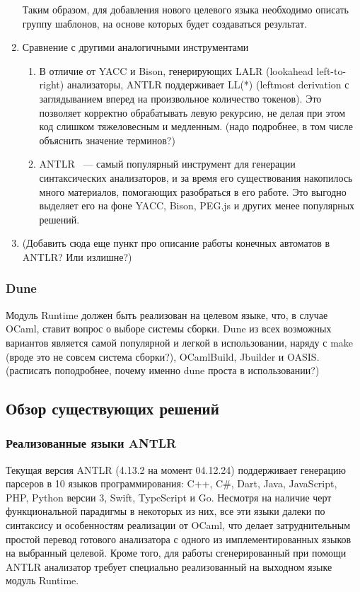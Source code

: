 \begin{enumerate}
    Таким образом, для добавления нового целевого языка необходимо описать группу шаблонов, на основе которых будет создаваться результат.
    \item Сравнение с другими аналогичными инструментами

    \begin{enumerate}
        \item В отличие от YACC и Bison, генерирующих LALR (lookahead left-to-right) анализаторы, ANTLR поддерживает LL(*) 
        (leftmost derivation с заглядыванием вперед на произвольное количество токенов). 
        Это позволяет корректно обрабатывать левую рекурсию, не делая при этом код слишком тяжеловесным и медленным. 
        (надо подробнее, в том числе объяснить значение терминов?)
        \item ANTLR ~--- самый популярный инструмент для генерации синтаксических анализаторов, и за время его существования накопилось 
        много материалов, помогающих разобраться в его работе. 
        Это выгодно выделяет его на фоне YACC, Bison, PEG.js и других менее популярных решений.
    \end{enumerate}

    \item (Добавить сюда еще пункт про описание работы конечных автоматов в ANTLR? Или излишне?)
\end{enumerate}

\subsubsection{Dune}

Модуль Runtime должен быть реализован на целевом языке, что, в случае OCaml, ставит вопрос о выборе системы сборки. 
Dune из всех возможных вариантов является самой популярной и легкой в использовании, наряду с make (вроде это не совсем система сборки?), 
OCamlBuild, Jbuilder и OASIS.
(расписать поподробнее, почему именно dune проста в использовании?)

\subsection{Обзор существующих решений}

\subsubsection{Реализованные языки ANTLR}

Текущая версия ANTLR (4.13.2 на момент 04.12.24) поддерживает генерацию парсеров в 10 языков программирования: 
C++, C\#, Dart, Java, JavaScript, PHP, Python версии 3, Swift, TypeScript и Go. 
Несмотря на наличие черт функциональной парадигмы в некоторых из них, все эти языки далеки по синтаксису и особенностям реализации от OCaml,
что делает затруднительным простой перевод готового анализатора с одного из имплементированных языков на выбранный целевой. 
Кроме того, для работы сгенерированный при помощи ANTLR анализатор требует специально реализованный на выходном языке модуль Runtime. 

